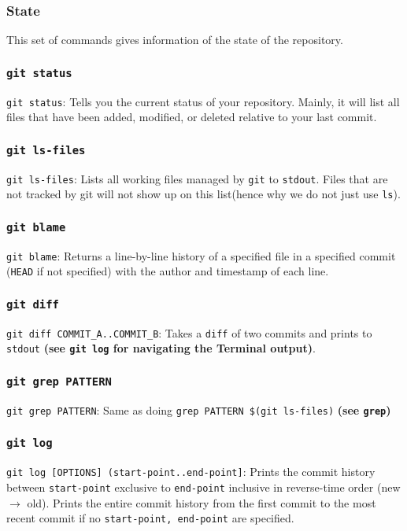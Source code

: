 \documentclass[13pt]{article}
\begin{document}
\subsubsection{State}
This set of commands gives information of the state of the repository.

\subsubsection*{\texttt{git status}}
\texttt{git status}: Tells you the current status of your repository. Mainly, it will list all files that have been added, modified, or deleted relative to your last commit.

\subsubsection*{\texttt{git ls-files}}
\texttt{git ls-files}: Lists all working files managed by \texttt{git} to \texttt{stdout}. Files that are not tracked by git will not show up on this list(hence why we do not just use \texttt{ls}).

\subsubsection*{\texttt{git blame}}
\texttt{git blame}: Returns a line-by-line history of a specified file in a specified commit (\texttt{HEAD} if not specified) with the author and timestamp of each line.

\subsubsection*{\texttt{git diff}}
\texttt{git diff COMMIT\_A..COMMIT\_B}: Takes a \texttt{diff} of two commits and prints to \texttt{stdout} \textbf{(see \texttt{git log} for navigating the Terminal output)}.

\subsubsection*{\texttt{git grep PATTERN}}
\texttt{git grep PATTERN}: Same as doing \texttt{grep PATTERN \$(git ls-files)} \textbf{(see \texttt{grep})}

\subsubsection*{\texttt{git log}}
\texttt{git log [OPTIONS] (start-point..end-point]}: Prints the commit history between \texttt{start-point} exclusive to \texttt{end-point} inclusive in reverse-time order (new $\rightarrow$ old). Prints the entire commit history from the first commit to the most recent commit if no \texttt{start-point, end-point} are specified.
\end{document}

